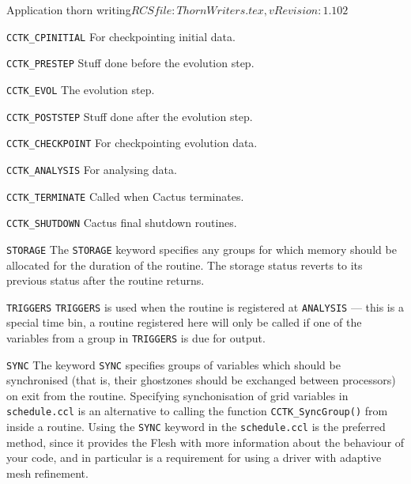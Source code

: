 \begin{cactuspart}{2}{Application thorn writing}{$RCSfile: ThornWriters.tex,v $}{$Revision: 1.102 $}
\begin{Lentry}
\begin{Lentry}
\item [{\tt CCTK\_CPINITIAL}]
For checkpointing initial data.

\item [{\tt CCTK\_PRESTEP}]
Stuff done before the evolution step.

\item [{\tt CCTK\_EVOL}]
The evolution step.

\item [{\tt CCTK\_POSTSTEP}]
Stuff done after the evolution step.

\item [{\tt CCTK\_CHECKPOINT}]
For checkpointing evolution data.

\item [{\tt CCTK\_ANALYSIS}]
For analysing data.

\item [{\tt CCTK\_TERMINATE}]
Called when Cactus terminates.

\item [{\tt CCTK\_SHUTDOWN}]
Cactus final shutdown routines.

%
\end{Lentry}


\item[{\tt STORAGE}] The {\tt STORAGE} keyword specifies any groups for
which  memory should be
allocated for the duration of the routine.
The storage status reverts to its previous status after the
routine returns.

\item[{\tt TRIGGERS}] {\tt TRIGGERS} is used when the routine is registered at {\tt ANALYSIS} ---
this is a
special time bin, a routine registered here will only be called if one of
the variables from a group in {\tt TRIGGERS} is due for output.

\item[{\tt SYNC}]
The keyword {\tt SYNC} specifies groups of variables which should be
synchronised (that is, their ghostzones should be exchanged between
processors) on exit from the routine. Specifying synchonisation of
grid variables in {\tt schedule.ccl} is an alternative to calling the
function {\tt CCTK\_SyncGroup()} from inside a routine. Using the {\tt SYNC}
keyword in the {\tt schedule.ccl} is the preferred method, since it
provides the Flesh with more information about the behaviour of your code,
and in particular is a requirement for using a driver with adaptive mesh
refinement.


\end{Lentry}
\end{cactuspart}
